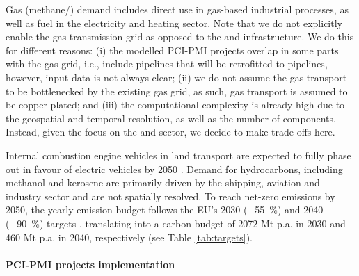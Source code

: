 \documentclass[preprint,12pt,sort&compress]{elsarticle}
\begin{document}
Gas (methane/) demand includes direct use in gas-based industrial processes, as well as fuel in the electricity and heating sector. Note that we do not explicitly enable the gas transmission grid as opposed to the  and  infrastructure. We do this for different reasons: (i) the modelled PCI-PMI projects overlap in some parts with the gas grid, i.e., include  pipelines that will be retrofitted to  pipelines, however, input data is not always clear; (ii) we do not assume the gas transport to be bottlenecked by the existing gas grid, as such, gas transport is assumed to be copper plated; and (iii) the computational complexity is already high due to the geospatial and temporal resolution, as well as the number of components. Instead, given the focus on the  and  sector, we decide to make trade-offs here.

Internal combustion engine vehicles in land transport are expected to fully phase out in favour of electric vehicles by 2050 \cite{zeyenShiftingBurdensHow2025a}. Demand for hydrocarbons, including methanol and kerosene are primarily driven by the shipping, aviation and industry sector and are not spatially resolved.
To reach net-zero  emissions by 2050, the yearly emission budget follows the EU's 2030 (\SI{-55}{\percent}) and 2040 (\SI{-90}{\percent}) targets \cite{europeancommissionFit55Delivering2021, europeancommission.directorategeneralforclimateaction.IndepthReportResults2024}, translating into a carbon budget of 2072 Mt p.a. in 2030 and 460 Mt p.a. in 2040, respectively (see Table \ref{tab:targets}).

\paragraph{PCI-PMI projects implementation}
\label{sec:pci-pmi_projects_implementation}
\end{document}

